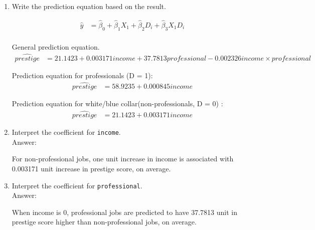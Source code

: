 \documentclass[12pt,letterpaper]{article}
\begin{document}
\begin{enumerate}
\begin{doublespace}
{\begin{verbatim}
		Residual standard error: 8.012 on 94 degrees of freedom
		(4 observations deleted due to missingness)
		Multiple R-squared:  0.7872,	Adjusted R-squared:  0.7804 
		F-statistic: 115.9 on 3 and 94 DF,  p-value: < 2.2e-16
	\end{verbatim}
	}
	\end{doublespace}
	
	\newpage
	\item [(c)]
	Write the prediction equation based on the result.
	
	\begin{align*}
		\hat{y} &= \hat{\beta}_0 + \hat{\beta}_1 X_1 + \hat{\beta}_2 D_i + \hat{\beta}_3 X_1 D_i \\
	\end{align*}
	
	General prediction equation.
	\begin{align*}
		\hat{prestige} &= 21.1423 + 0.003171income + 37.7813professional - 0.002326income \times professional
	\end{align*}
	
	Prediction equation for professionals (D = 1):
	\begin{align*}
		\hat{prestige} &= 58.9235 + 0.000845income
	\end{align*}
	
	Prediction equation for white/blue collar(non-professionals, D = 0) :
	\begin{align*}
		\hat{prestige} &= 21.1423 + 0.003171income
	\end{align*}


	
\newpage
	\item [(d)]
	Interpret the coefficient for \texttt{income}.\\
	Answer: \\
	\begin{doublespace}
		For non-professional jobs, one unit increase in income is associated with 0.003171 unit increase in prestige score, on average.
	\end{doublespace}
	
	\item [(e)]
	Interpret the coefficient for \texttt{professional}.\\	
	Answer: \\
	\begin{doublespace}
		When income is 0, professional jobs are predicted to have 37.7813 unit in prestige score higher than non-professional jobs, on average.
	\end{doublespace}
	

\end{enumerate}
\end{document}
